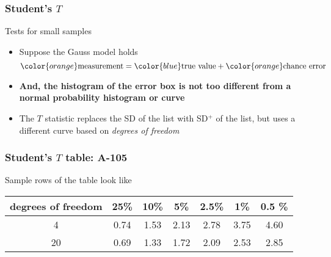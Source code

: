 \documentclass[handout]{beamer}
\begin{document}

   \begin{frame} \frametitle{Student's $T$}

   \begin{block}
   {Tests for small samples}
   \begin{itemize}

   \item Suppose the Gauss model holds
     $$
     {\color{orange} \text{measurement}} = {\color{blue} \text{true value}} + {\color{orange} \text{chance error}}
     $$
   \item {\bf And, the histogram of the error box is not too different
   from a normal probability histogram or curve}

    \item The $T$ statistic replaces the SD of the list with SD$^+$ of
   the list, but uses a different curve based on
     {\em degrees of freedom}
   \end{itemize}
   \end{block}
   \end{frame}


   \begin{frame} \frametitle{Student's $T$ table: A-105}

   \begin{block}
   {Sample rows of the table look like}
   \begin{tabular}{ccccccc}
   {\small degrees of freedom} & 25\% & 10\% & 5\% & 2.5\% & 1\% & 0.5 \% \\ \hline

   4 & 0.74 & 1.53 & 2.13 & 2.78 & 3.75 & 4.60 \\
   20 & 0.69 & 1.33 & 1.72 & 2.09 & 2.53 & 2.85 \\
   \end{tabular}
   \end{block}
   \end{frame}

\end{document}
